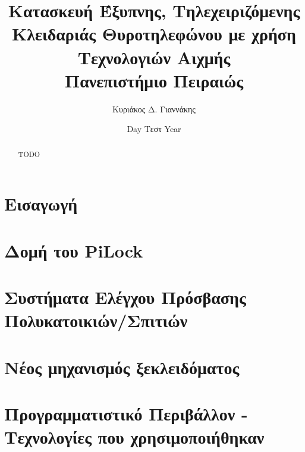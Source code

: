 \documentclass[12pt]{report}
\title{
    {Κατασκευή Έξυπνης, Τηλεχειριζόμενης Κλειδαριάς Θυροτηλεφώνου με χρήση Τεχνολογιών Αιχμής }\\
    {\large Πανεπιστήμιο Πειραιώς}
}
\author{Κυριάκος Δ. Γιαννάκης}
\date{Day Τεστ Year}
\begin{document}
    \maketitle
    
    \begin{abstract}
        TODO
    \end{abstract}
    
    \tableofcontents
    
    \chapter{Εισαγωγή}
    

    \chapter{Δομή του PiLock}
    

    \chapter{Συστήματα Ελέγχου Πρόσβασης Πολυκατοικιών/Σπιτιών}
    

    \chapter{Νέος μηχανισμός ξεκλειδόματος}
    

    \chapter{Προγραμματιστικό Περιβάλλον - Τεχνολογίες που χρησιμοποιήθηκαν}
    

    
    
\end{document}
